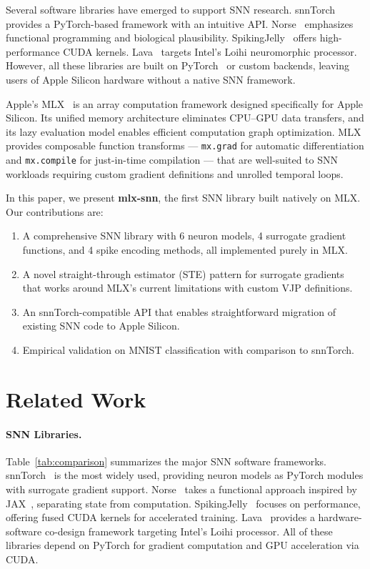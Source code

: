 \documentclass[11pt]{article}
\begin{document}
Several software libraries have emerged to support SNN research. snnTorch~\citep{eshraghian2023training} provides a PyTorch-based framework with an intuitive API. Norse~\citep{pehle2021norse} emphasizes functional programming and biological plausibility. SpikingJelly~\citep{fang2023spikingjelly} offers high-performance CUDA kernels. Lava~\citep{lava2021} targets Intel's Loihi neuromorphic processor. However, all these libraries are built on PyTorch~\citep{paszke2019pytorch} or custom backends, leaving users of Apple Silicon hardware without a native SNN framework.

Apple's MLX~\citep{mlx2023} is an array computation framework designed specifically for Apple Silicon. Its unified memory architecture eliminates CPU--GPU data transfers, and its lazy evaluation model enables efficient computation graph optimization. MLX provides composable function transforms --- \texttt{mx.grad} for automatic differentiation and \texttt{mx.compile} for just-in-time compilation --- that are well-suited to SNN workloads requiring custom gradient definitions and unrolled temporal loops.

In this paper, we present \textbf{mlx-snn}, the first SNN library built natively on MLX. Our contributions are:
\begin{enumerate}[nosep]
    \item A comprehensive SNN library with 6 neuron models, 4 surrogate gradient functions, and 4 spike encoding methods, all implemented purely in MLX.
    \item A novel straight-through estimator (STE) pattern for surrogate gradients that works around MLX's current limitations with custom VJP definitions.
    \item An snnTorch-compatible API that enables straightforward migration of existing SNN code to Apple Silicon.
    \item Empirical validation on MNIST classification with comparison to snnTorch.
\end{enumerate}

\section{Related Work}

\paragraph{SNN Libraries.}
Table~\ref{tab:comparison} summarizes the major SNN software frameworks. snnTorch~\citep{eshraghian2023training} is the most widely used, providing neuron models as PyTorch modules with surrogate gradient support. Norse~\citep{pehle2021norse} takes a functional approach inspired by JAX~\citep{jax2018}, separating state from computation. SpikingJelly~\citep{fang2023spikingjelly} focuses on performance, offering fused CUDA kernels for accelerated training. Lava~\citep{lava2021} provides a hardware-software co-design framework targeting Intel's Loihi processor. All of these libraries depend on PyTorch for gradient computation and GPU acceleration via CUDA.
\end{document}

